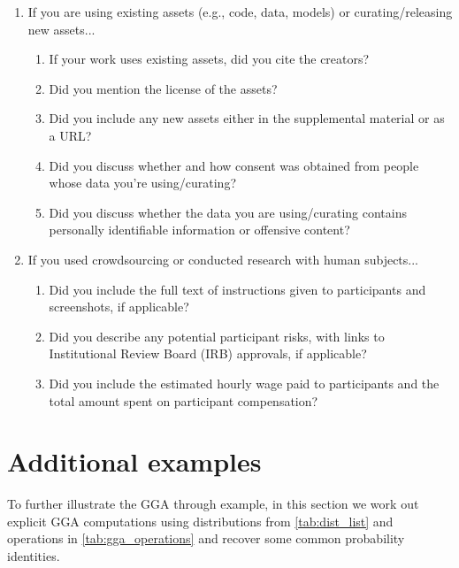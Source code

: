 \documentclass{article}
\theoremstyle{definition}
\begin{document}
\begin{enumerate}
\item If you are using existing assets (e.g., code, data, models) or curating/releasing new assets...
\begin{enumerate}
  \item If your work uses existing assets, did you cite the creators?
  \item Did you mention the license of the assets?
  \item Did you include any new assets either in the supplemental material or as a URL?
  \item Did you discuss whether and how consent was obtained from people whose data you're using/curating?
    \answerNA{}
  \item Did you discuss whether the data you are using/curating contains personally identifiable information or offensive content?
    \answerNA{}
\end{enumerate}

\item If you used crowdsourcing or conducted research with human subjects...
\begin{enumerate}
  \item Did you include the full text of instructions given to participants and screenshots, if applicable?
    \answerNA{}
  \item Did you describe any potential participant risks, with links to Institutional Review Board (IRB) approvals, if applicable?
    \answerNA{}
  \item Did you include the estimated hourly wage paid to participants and the total amount spent on participant compensation?
    \answerNA{}
\end{enumerate}

\end{enumerate}

\ifdefined\remappendix
\newpage

\appendix


\section{Additional examples}\label{sec:addtl_eg}

To further illustrate the GGA through example, in this section we work
out explicit GGA computations using distributions
from \cref{tab:dist_list} and operations in \cref{tab:gga_operations}
and recover some common probability identities.
\end{document}
